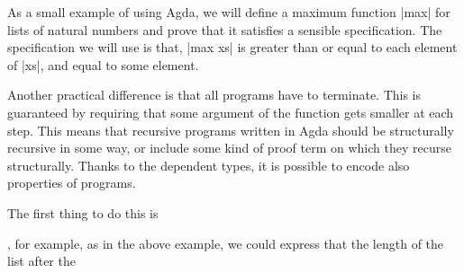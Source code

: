 As a small example of using Agda, we will define a maximum function |max| for lists of natural numbers and prove that it satisfies a sensible specification. The specification we will use is that, |max xs| is greater than or equal to each element of |xs|, and equal to some element. 


Another practical difference is that all programs have to terminate. This is guaranteed by requiring that some argument of the function gets smaller at each step. This means that recursive programs written in Agda should be structurally recursive in some way, or include some kind of proof term on which they recurse structurally.
Thanks to the dependent types, it is possible to encode also properties of programs.

The first thing to do this is 

, for example, as in the above example, we could express that the length of the list after the 
